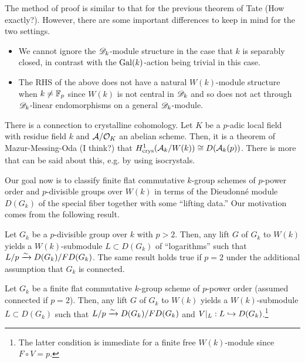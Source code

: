 \documentclass[11pt]{article}
\renewcommand{\A}{\mathcal{A}}
\newcommand{\crys}{\textrm{crys}}
\newcommand{\D}{\ms{D}}
\begin{document}
The method of proof is similar to that for the previous theorem of Tate (How exactly?). However, there are some important differences to keep in mind for the two settings.
\begin{itemize}
\item We cannot ignore the $\D_k$-module structure in the case that $k$ is separably closed, in contrast with the $\operatorname{Gal}(k)$-action being trivial in this case.

\item The RHS of the above does not have a natural $W(k)$-module structure when $k\neq\mathbb{F}_p$ since $W(k)$ is not central in $\D_k$ and so does not act through $\D_k$-linear endomorphisms on a general $\D_k$-module.
\end{itemize}

\begin{remark}
There is a connection to crystalline cohomology. Let $K$ be a $p$-adic local field with residue field $k$ and $\A/\O_K$ an abelian scheme. Then, it is a theorem of Mazur-Messing-Oda (I think?) that $H_{\crys}^1(\A_k/W(k))\iso D(\A_k(p))$. There is more that can be said about this, e.g. by using isocrystals.
\end{remark}

Our goal now is to classify finite flat commutative $k$-group schemes of $p$-power order and $p$-divisible groups over $W(k)$ in terms of the Dieudonn\'{e} module $D(G_k)$ of the special fiber together with some ``lifting data.'' Our motivation comes from the following result.

\begin{theorem}[Fontaine]
\hfill
\begin{enum}{\alph}
\item Let $G_k$ be a $p$-divisible group over $k$ with $p>2$. Then, any lift $G$ of $G_k$ to $W(k)$ yields a $W(k)$-submodule $L\subset D(G_k)$ of ``logarithms'' such that $L/p\xrightarrow{\sim}D(G_k)/FD(G_k)$. The same result holds true if $p=2$ under the additional assumption that $G_k$ is connected.

\item Let $G_k$ be a finite flat commutative $k$-group scheme of $p$-power order (assumed connected if $p=2$). Then, any lift $G$ of $G_k$ to $W(k)$ yields a $W(k)$-submodule $L\subset D(G_k)$ such that $L/p\xrightarrow{\sim}D(G_k)/FD(G_k)$ and $V|_L: L\hookrightarrow D(G_k)$.\footnote{The latter condition is immediate for a finite free $W(k)$-module since $F\circ V=p$.}
\end{enum}
\end{theorem}
\end{document}
